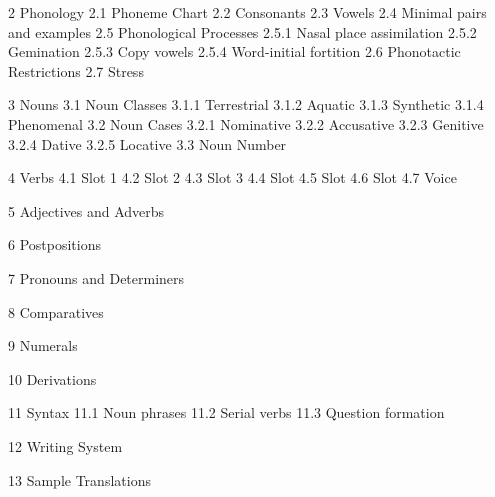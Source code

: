 2 Phonology
  2.1 Phoneme Chart
  2.2 Consonants
  2.3 Vowels
  2.4 Minimal pairs and examples
  2.5 Phonological Processes
    2.5.1 Nasal place assimilation
    2.5.2 Gemination
    2.5.3 Copy vowels
    2.5.4 Word-initial fortition
  2.6 Phonotactic Restrictions
  2.7 Stress

3 Nouns
  3.1 Noun Classes
    3.1.1 Terrestrial
    3.1.2 Aquatic
    3.1.3 Synthetic
    3.1.4 Phenomenal
  3.2 Noun Cases
    3.2.1 Nominative
    3.2.2 Accusative
    3.2.3 Genitive
    3.2.4 Dative
    3.2.5 Locative
  3.3 Noun Number

4 Verbs
  4.1 Slot 1
  4.2 Slot 2
  4.3 Slot 3
  4.4 Slot
  4.5 Slot
  4.6 Slot
  4.7 Voice

5 Adjectives and Adverbs

6 Postpositions

7 Pronouns and Determiners

8 Comparatives

9 Numerals

10 Derivations

11 Syntax
  11.1 Noun phrases
  11.2 Serial verbs
  11.3 Question formation

12 Writing System

13 Sample Translations